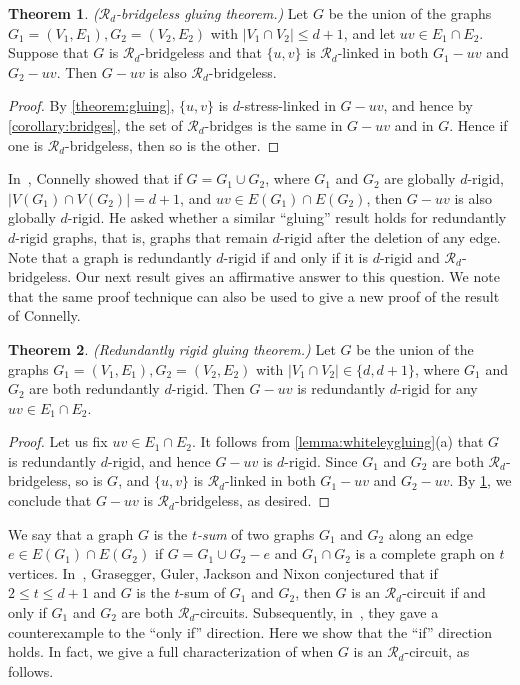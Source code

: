 \documentclass[11pt,a4paper,dvipsnames]{scrartcl}
\theoremstyle{definition}
\newtheorem{theorem}{Theorem}[section]
\newcommand{\globrig}[1]{globally $#1$-rigid}
\newcommand{\rig}[1]{$#1$-rigid}
\newcommand{\strongly}[1]{${#1}$-stress-linked}
\begin{document}
\begin{theorem}\label{theorem:Rdbridgeless}\emph{($\mathcal{R}_d$-bridgeless gluing theorem.)}\newline
     Let $G$ be the union of the graphs $G_1 = (V_1,E_1), G_2 = (V_2,E_2)$ with $|V_1 \cap V_2| \leq d+1$, and let $uv \in E_1 \cap E_2$. Suppose that $G$ is $\mathcal{R}_d$-bridgeless and that $\{u,v\}$ is $\mathcal{R}_d$-linked in both $G_1-uv$ and $G_2-uv$. Then $G-uv$ is also $\mathcal{R}_d$-bridgeless.
\end{theorem}
\begin{proof}
    By \cref{theorem:gluing}, $\{u,v\}$ is \strongly{d} in $G-uv$, and hence by \cref{corollary:bridges}, the set of $\mathcal{R}_d$-bridges is the same in $G-uv$ and in $G$. Hence if one is $\mathcal{R}_d$-bridgeless, then so is the other. 
\end{proof}

In~\cite{connelly_2011a}, Connelly showed that if $G = G_1 \cup G_2$, where $G_1$ and $G_2$ are \globrig{d}, $|V(G_1) \cap V(G_2)| = d+1$, and $uv \in E(G_1) \cap E(G_2)$, then $G-uv$ is also \globrig{d}. He asked whether a similar ``gluing'' result holds for redundantly \rig{d} graphs, that is, graphs that remain \rig{d} after the deletion of any edge. Note that a graph is redundantly \rig{d} if and only if it is \rig{d} and $\mathcal{R}_d$-bridgeless. Our next result gives an affirmative answer to this question. We note that the same proof technique can also be used to give a new proof of the result of Connelly.

\begin{theorem}\label{theorem:connellyquestion} \emph{(Redundantly rigid gluing theorem.)} \newline
    Let $G$ be the union of the graphs $G_1 = (V_1,E_1), G_2 = (V_2,E_2)$ with $|V_1 \cap V_2|\in \{d,d+1\}$, where $G_1$ and $G_2$ are both redundantly \rig{d}. Then $G-uv$ is redundantly \rig{d} for any $uv \in E_1 \cap E_2$. 
\end{theorem}
\begin{proof}
    Let us fix $uv \in E_1 \cap E_2$. It follows from \cref{lemma:whiteleygluing}(a) that $G$ is redundantly \rig{d}, and hence $G-uv$ is \rig{d}. Since $G_1$ and $G_2$ are both $\mathcal{R}_d$-bridgeless, so is $G$, and $\{u,v\}$ is $\mathcal{R}_d$-linked in both $G_1-uv$ and $G_2-uv$. By \cref{theorem:Rdbridgeless}, we conclude that $G-uv$ is $\mathcal{R}_d$-bridgeless, as desired.
\end{proof}

We say that a graph $G$ is the \emph{$t$-sum} of two graphs $G_1$ and $G_2$ along an edge $e \in E(G_1) \cap E(G_2)$ if $G = G_1 \cup G_2 -e$ and $G_1 \cap G_2$ is a complete graph on $t$ vertices. 
In~\cite{grasegger.etal_2022}, Grasegger, Guler, Jackson and Nixon conjectured that if $2 \leq t \leq d+1$ and $G$ is the $t$-sum of $G_1$ and $G_2$, then $G$ is an $\mathcal{R}_d$-circuit if and only if $G_1$ and $G_2$ are both $\mathcal{R}_d$-circuits. Subsequently, in~\cite{grasegger.etal_2023}, they gave a counterexample to the ``only if'' direction. Here we show that the ``if'' direction holds. In fact, we give a full characterization of when $G$ is an $\mathcal{R}_d$-circuit, as follows.
\end{document}
